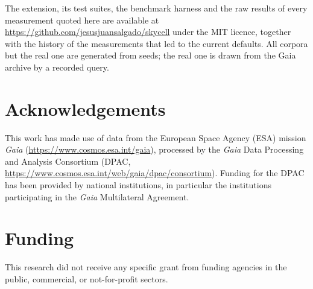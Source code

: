 \documentclass[final,5p,times,twocolumn,authoryear]{elsarticle}
\begin{document}
The extension, its test suites, the benchmark harness and the raw results of every
measurement quoted here are available at
\url{https://github.com/jesusjuansalgado/skycell} under the MIT licence, together with
the history of the measurements that led to the current defaults. All corpora but the
real one are generated from seeds; the real one is drawn from the Gaia archive by a
recorded query.

\section*{Acknowledgements}

This work has made use of data from the European Space Agency (ESA) mission \emph{Gaia}
(\url{https://www.cosmos.esa.int/gaia}), processed by the \emph{Gaia} Data Processing and
Analysis Consortium (DPAC, \url{https://www.cosmos.esa.int/web/gaia/dpac/consortium}).
Funding for the DPAC has been provided by national institutions, in particular the
institutions participating in the \emph{Gaia} Multilateral Agreement.

\section*{Funding}

This research did not receive any specific grant from funding agencies in the public,
commercial, or not-for-profit sectors.


\end{document}
